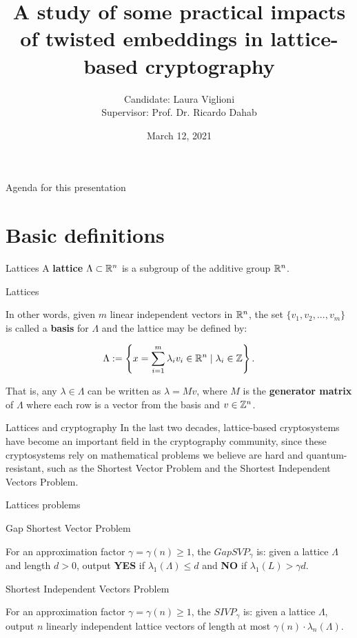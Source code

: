 \documentclass[notheorems, bigger]{beamer}
\author{Candidate: Laura Viglioni \\ Supervisor: Prof. Dr. Ricardo Dahab}
\date{March 12, 2021}
\title{A study of some practical impacts of twisted embeddings in lattice-based cryptography}
\begin{document}
\maketitle
\begin{frame}{Agenda for this presentation}
\tableofcontents
\end{frame}

\section{Basic definitions}
\label{sec:org7bf0605}
\begin{frame}[label={sec:orga347da9}]{Lattices}
A \textbf{lattice} \(\Lambda \subset \mathbb{R}^n\) is a subgroup of the additive group \(\mathbb{R}^n\).
\end{frame}
\begin{frame}[label={sec:orga945a59}]{Lattices}
\begin{text}
  In other words, given $m$ linear independent vectors in $\mathbb{R}^n$, the set
  $\{v_1, v_2, ..., v_m\}$ is called a \textbf{basis} for $\Lambda$ and the lattice may be defined
  by:

  \begin{equation*}
    \Lambda := \left\{x = \sum_{i=1}^m{\lambda_iv_i} \in \mathbb{R}^n \; | \; \lambda_i \in \mathbb{Z}\right\}.
  \end{equation*}

  That is, any $\lambda \in \Lambda$ can be written as $\lambda = Mv$, where $M$ is the
  \textbf{generator matrix} of $\Lambda$ where each row is a vector from the basis and
  $v \in \mathbb{Z}^n$.
\end{text}
\end{frame}
\begin{frame}[label={sec:orgfc8adf0}]{Lattices and cryptography}
In the last two decades, lattice-based cryptosystems have become an important field in the cryptography community, since these cryptosystems rely on mathematical problems we believe are hard and quantum-resistant, such as the Shortest Vector Problem and the Shortest Independent Vectors Problem.
\end{frame}
\begin{frame}[label={sec:org5683683}]{Lattices problems}
\begin{block}{Gap Shortest Vector Problem}
\begin{text}
  For an approximation factor $\gamma  = \gamma(n) \geq 1$, the $GapSVP_\gamma $ is: given a lattice
  $\Lambda$ and length $d > 0$, output \textbf{YES} if $\lambda_1(\Lambda) \leq d$ and \textbf{NO} if
  $\lambda_1(L) > \gamma d$. 
\end{text}
\end{block}
\begin{block}{Shortest Independent Vectors Problem}
\begin{text}
  For an approximation factor $\gamma = \gamma(n) \geq 1$, the $SIVP_\gamma$ is: given a lattice $\Lambda$, output $n$ linearly independent lattice vectors of length at most $\gamma(n) \cdot \lambda_n(\Lambda)$.
\end{text}
\end{block}
\end{frame}
\end{document}
